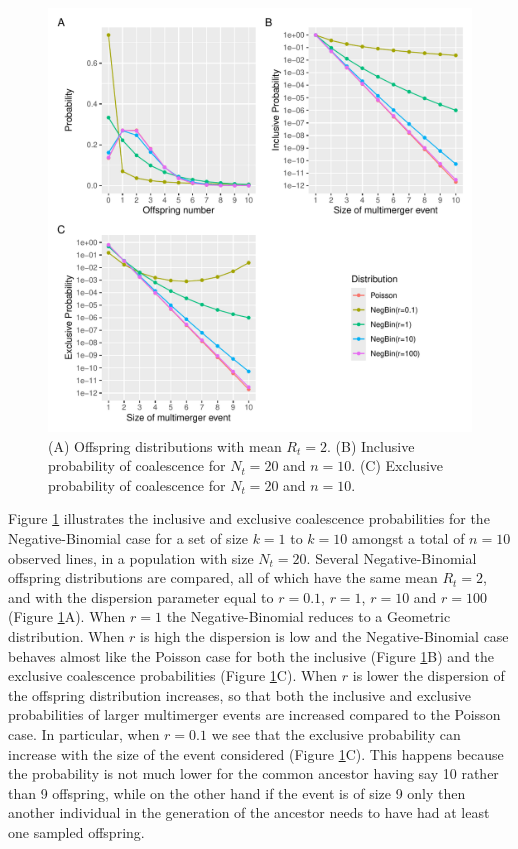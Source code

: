 \documentclass{article}
\begin{document}
\begin{figure}[!p]
\begin{center}
\includegraphics[width=15cm]{../run/figureNegBin.pdf}
\end{center}
\caption{(A) Offspring distributions with mean $R_t=2$. (B) Inclusive probability of coalescence for $N_t=20$ and $n=10$. (C) Exclusive probability of coalescence for $N_t=20$ and $n=10$.
\label{fig:negbin}}
\end{figure}

Figure \ref{fig:negbin} illustrates the inclusive and exclusive coalescence probabilities for
the Negative-Binomial case for a set of size $k=1$ to $k=10$ amongst a total of $n=10$
 observed lines, in a population with size $N_t=20$. 
Several Negative-Binomial offspring distributions are compared, 
all of which have the same mean $R_t=2$,
and with the dispersion parameter equal to $r=0.1$, $r=1$, $r=10$ and $r=100$
(Figure \ref{fig:negbin}A).
When $r=1$ the Negative-Binomial reduces to a Geometric distribution.
When $r$ is high 
the dispersion is low and the Negative-Binomial case 
behaves almost like the Poisson case
for both the inclusive (Figure \ref{fig:negbin}B) and the exclusive coalescence
probabilities (Figure \ref{fig:negbin}C).
When $r$ is lower the dispersion of the
offspring distribution increases, so that 
both the inclusive and exclusive probabilities of larger multimerger events are increased
compared to the Poisson case.
In particular, when $r=0.1$ we see that the exclusive probability can increase
with the size of the event considered (Figure \ref{fig:negbin}C). This happens because
the probability is not much lower for the common ancestor having say 10 rather than 9 offspring,
while on the other hand if the event is of size 9 only then another individual in the generation
of the ancestor needs to have had at least one sampled offspring. 
\end{document}
